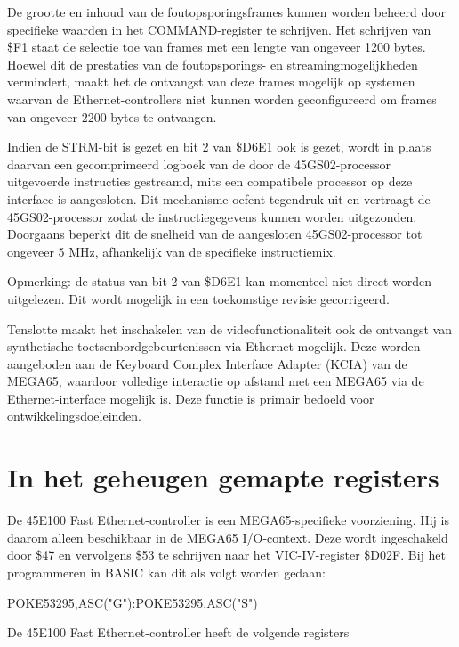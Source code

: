 De grootte en inhoud van de foutopsporingsframes kunnen worden beheerd door specifieke waarden in het COMMAND-register te schrijven. Het schrijven van \$F1 staat de selectie toe van frames met een lengte van ongeveer 1200 bytes. Hoewel dit de prestaties van de foutopsporings- en streamingmogelijkheden vermindert, maakt het de ontvangst van deze frames mogelijk op systemen waarvan de Ethernet-controllers niet kunnen worden geconfigureerd om frames van ongeveer 2200 bytes te ontvangen.

Indien de STRM-bit is gezet en bit 2 van \$D6E1 ook is gezet, wordt in plaats daarvan een gecomprimeerd logboek van de door de 45GS02-processor uitgevoerde instructies gestreamd, mits een compatibele processor op deze interface is aangesloten. Dit mechanisme oefent tegendruk uit en vertraagt de 45GS02-processor zodat de instructiegegevens kunnen worden uitgezonden. Doorgaans beperkt dit de snelheid van de aangesloten 45GS02-processor tot ongeveer 5 MHz, afhankelijk van de specifieke instructiemix.

Opmerking: de status van bit 2 van \$D6E1 kan momenteel niet direct worden uitgelezen. Dit wordt mogelijk in een toekomstige revisie gecorrigeerd.

Tenslotte maakt het inschakelen van de videofunctionaliteit ook de ontvangst van synthetische toetsenbordgebeurtenissen via Ethernet mogelijk. Deze worden aangeboden aan de Keyboard Complex Interface Adapter (KCIA) van de MEGA65, waardoor volledige interactie op afstand met een MEGA65 via de Ethernet-interface mogelijk is. Deze functie is primair bedoeld voor ontwikkelingsdoeleinden.

\section{In het geheugen gemapte registers}

De 45E100 Fast Ethernet-controller is een MEGA65-specifieke voorziening. Hij is daarom alleen beschikbaar in de MEGA65 I/O-context. Deze wordt ingeschakeld door \$47 en vervolgens \$53 te schrijven naar het VIC-IV-register \$D02F. Bij het programmeren in BASIC kan dit als volgt worden gedaan:

\begin{screencode}
POKE53295,ASC("G"):POKE53295,ASC("S")
\end{screencode}

De 45E100 Fast Ethernet-controller heeft de volgende registers



